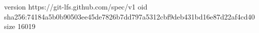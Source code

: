 version https://git-lfs.github.com/spec/v1
oid sha256:74184a5b0b90503ee45de7826b7dd797a5312cbf9deb431bd16e87d22af4cd40
size 16019
